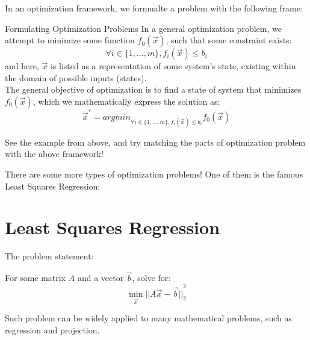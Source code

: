 In an optimization framework, we formualte a problem with the following frame:
\begin{ln-explain}{Formulating Optimization Problems}{}
    In a general optimization problem, we attempt to minimize some function $f_0(\vec{x})$, such that some constraint exists:
    \[\forall i \in \{1, \dots, m\}, f_i(\vec{x}) \leq b_i\]
    and here, $\vec{x}$ is listed as a representation of some system's state, existing within the domain of possible inputs (states). \\
    The general objective of optimization is to find a state of system that minimizes $f_0(\vec{x})$, which we mathematically express the solution as:
    \[\vec{x}^* = {argmin}_{\forall i \in \{1, \dots, m\}, f_i(\vec{x}) \leq b_i} f_0(\vec{x})\]
\end{ln-explain}
See the example from above, and try matching the parts of optimization problem with the above framework!

There are some more types of optimization problems! One of them is the famous Least Squares Regression:

\section{Least Squares Regression}
The problem statement:
\begin{center}
    For some matrix $A$ and a vector $\vec{b}$, solve for:
    \[\min_{\vec{x}} {\lvert\lvert A \vec{x} - \vec{b} \rvert\rvert}_2^2\]
\end{center}

Such problem can be widely applied to many mathematical problems, such as regression and projection.

